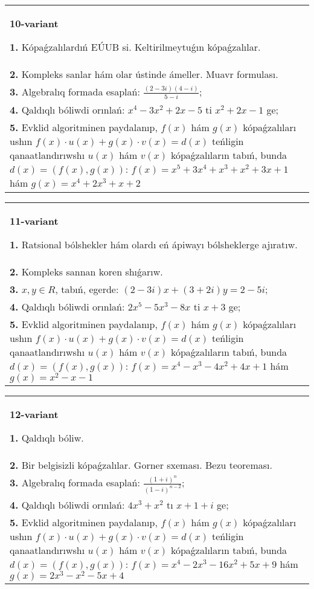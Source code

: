 \documentclass{article}
\begin{document}
\begin{tabular}{m{17cm}}
\textbf{10-variant}
\newline

\textbf{1.} Kópaǵzalılardıń EÚUB si. Keltirilmeytuǵın   kópaǵzalılar. \\
\textbf{2.} Kompleks sanlar hám olar ústinde ámeller. Muavr formulası.  \\
\textbf{3.} Algebralıq formada esaplań: $\frac{(2-3 i)(4-i)}{5-i}$; \\
\textbf{4.} Qaldıqlı bóliwdi orınlań: $x^4-3 x^2+2 x-5$ ti $x^2+2 x-1$ ge; \\
\textbf{5.} Evklid algoritminen paydalanıp, $f(x)$ hám $g(x)$ kópaǵzalıları ushın $f(x) \cdot u(x)+g(x) \cdot v(x)=d(x)$ teńligin qanaatlandırıwshı $u(x)$ hám $v(x)$ kópaǵzalıların tabıń, bunda $d(x)=(f(x), g(x))$:  $f(x)=x^5+3 x^4+x^3+x^2+3 x+1$ hám $g(x)=x^4+2 x^3+x+2$ \\

\end{tabular}
\vspace{1cm}


\begin{tabular}{m{17cm}}
\textbf{11-variant}
\newline

\textbf{1.} Ratsional bólshekler hám olardı eń ápiwayı bólsheklerge ajıratıw. \\
\textbf{2.} Kompleks sannan koren shıǵarıw. \\
\textbf{3.}  $x, y \in R$, tabıń, egerde: $(2-3 i) x+(3+2 i) y=2-5 i$; \\
\textbf{4.} Qaldıqlı bóliwdi orınlań: $2 x^5-5 x^3-8 x$ ti $x+3$ ge; \\
\textbf{5.} Evklid algoritminen paydalanıp, $f(x)$ hám $g(x)$ kópaǵzalıları ushın $f(x) \cdot u(x)+g(x) \cdot v(x)=d(x)$ teńligin qanaatlandırıwshı $u(x)$ hám $v(x)$ kópaǵzalıların tabıń, bunda $d(x)=(f(x), g(x))$:  $f(x)=x^4-x^3-4 x^2+4 x+1$ hám $g(x)=x^2-x-1$ \\

\end{tabular}
\vspace{1cm}


\begin{tabular}{m{17cm}}
\textbf{12-variant}
\newline

\textbf{1.} Qaldıqlı bóliw.  \\
\textbf{2.} Bir belgisizli kópaǵzalılar. Gorner sxeması. Bezu teoreması.  \\
\textbf{3.} Algebralıq formada esaplań: $\frac{(1+i)^n}{(1-i)^{n-2}}$; \\
\textbf{4.} Qaldıqlı bóliwdi orınlań: $4 x^3+x^2$ tı $x+1+i$ ge; \\
\textbf{5.} Evklid algoritminen paydalanıp, $f(x)$ hám $g(x)$ kópaǵzalıları ushın $f(x) \cdot u(x)+g(x) \cdot v(x)=d(x)$ teńligin qanaatlandırıwshı $u(x)$ hám $v(x)$ kópaǵzalıların tabıń, bunda $d(x)=(f(x), g(x))$:  $f(x)=x^4-2 x^3-16 x^2+5 x+9$ hám $g(x)=2 x^3-x^2-5 x+4$ \\

\end{tabular}
\vspace{1cm}
\end{document}
